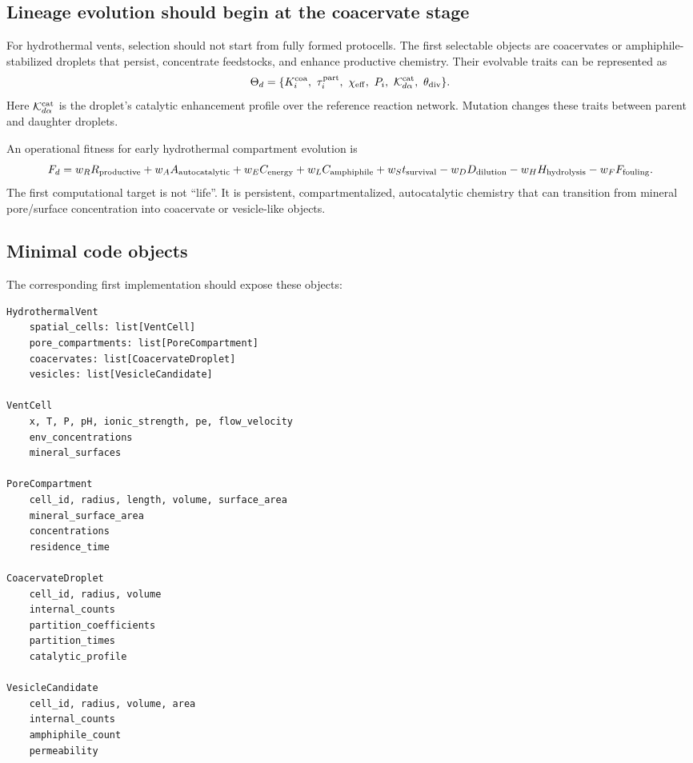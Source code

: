\documentclass[11pt]{article}
\begin{document}
\subsection{Lineage evolution should begin at the coacervate stage}

For hydrothermal vents, selection should not start from fully formed
protocells. The first selectable objects are coacervates or amphiphile-stabilized
droplets that persist, concentrate feedstocks, and enhance productive chemistry.
Their evolvable traits can be represented as
\begin{equation}
\Theta_d
=
\{
K_i^{\rm coa},\ \tau_i^{\rm part},\ 
\chi_{\rm eff},\ P_i,\ 
\mathcal{K}_{d\alpha}^{\rm cat},\ 
\theta_{\rm div}
\}.
\end{equation}
Here $\mathcal{K}_{d\alpha}^{\rm cat}$ is the droplet's catalytic enhancement
profile over the reference reaction network. Mutation changes these traits
between parent and daughter droplets.

An operational fitness for early hydrothermal compartment evolution is
\begin{equation}
F_d
=
w_R R_{\rm productive}
+
w_A A_{\rm autocatalytic}
+
w_E C_{\rm energy}
+
w_L C_{\rm amphiphile}
+
w_S t_{\rm survival}
-
w_D D_{\rm dilution}
-
w_H H_{\rm hydrolysis}
-
w_F F_{\rm fouling}.
\end{equation}
The first computational target is not ``life''. It is persistent,
compartmentalized, autocatalytic chemistry that can transition from mineral
pore/surface concentration into coacervate or vesicle-like objects.

\subsection{Minimal code objects}

The corresponding first implementation should expose these objects:
\begin{verbatim}
HydrothermalVent
    spatial_cells: list[VentCell]
    pore_compartments: list[PoreCompartment]
    coacervates: list[CoacervateDroplet]
    vesicles: list[VesicleCandidate]

VentCell
    x, T, P, pH, ionic_strength, pe, flow_velocity
    env_concentrations
    mineral_surfaces

PoreCompartment
    cell_id, radius, length, volume, surface_area
    mineral_surface_area
    concentrations
    residence_time

CoacervateDroplet
    cell_id, radius, volume
    internal_counts
    partition_coefficients
    partition_times
    catalytic_profile

VesicleCandidate
    cell_id, radius, volume, area
    internal_counts
    amphiphile_count
    permeability
\end{verbatim}
\end{document}
